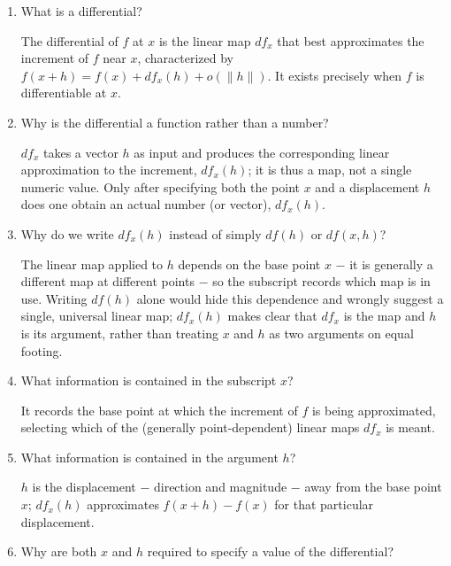 \documentclass{self-check}
\begin{document}
\begin{enumerate}[resume, leftmargin=*, itemsep=8pt]
  \item What is a differential?
    \begin{answer}
      The differential of \(f\) at \(x\) is the linear map \(df_{x}\) that best approximates the increment of \(f\) near \(x\), characterized by \(f(x+h)=f(x)+df_{x}(h)+o(\|h\|)\). It exists precisely when \(f\) is differentiable at \(x\).
    \end{answer}
  \item Why is the differential a function rather than a number?
    \begin{answer}
      \(df_{x}\) takes a vector \(h\) as input and produces the corresponding linear approximation to the increment, \(df_{x}(h)\); it is thus a map, not a single numeric value. Only after specifying both the point \(x\) and a displacement \(h\) does one obtain an actual number (or vector), \(df_{x}(h)\).
    \end{answer}
  \item Why do we write \(df_{x}(h)\) instead of simply \(df(h)\) or \(df(x,h)\)?
    \begin{answer}
      The linear map applied to \(h\) depends on the base point \(x\) \(-\) it is generally a different map at different points \(-\) so the subscript records which map is in use. Writing \(df(h)\) alone would hide this dependence and wrongly suggest a single, universal linear map; \(df_{x}(h)\) makes clear that \(df_{x}\) is the map and \(h\) is its argument, rather than treating \(x\) and \(h\) as two arguments on equal footing.
    \end{answer}
  \item What information is contained in the subscript \(x\)?
    \begin{answer}
      It records the base point at which the increment of \(f\) is being approximated, selecting which of the (generally point-dependent) linear maps \(df_{x}\) is meant.
    \end{answer}
  \item What information is contained in the argument \(h\)?
    \begin{answer}
      \(h\) is the displacement \(-\) direction and magnitude \(-\) away from the base point \(x\); \(df_{x}(h)\) approximates \(f(x+h)-f(x)\) for that particular displacement.
    \end{answer}
  \item Why are both \(x\) and \(h\) required to specify a value of the differential?

\end{enumerate}
\end{document}

